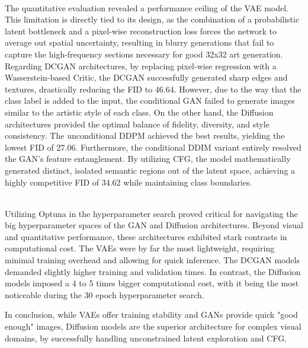 \documentclass[runningheads]{llncs}
\begin{document}
\noindent
\\
The quantitative evaluation revealed a performance ceiling of the VAE model. This limitation is directly tied to its design, as the combination of a probabilistic latent bottleneck and a pixel-wise reconstruction loss forces the network to average out spatial uncertainty, resulting in blurry generations that fail to capture the high-frequency sections necessary for good 32x32 art generation. Regarding DCGAN architectures, by replacing pixel-wise regression with a Wasserstein-based Critic, the DCGAN successfully generated sharp edges and textures, drastically reducing the FID to 46.64. However, due to the way that the class label is added to the input, the conditional GAN failed to generate images similar to the artistic style of each class. On the other hand, the Diffusion architectures provided the optimal balance of fidelity, diversity, and style consistency. The unconditional DDPM achieved the best results, yielding the lowest FID of 27.06. Furthermore, the conditional DDIM variant entirely resolved the GAN's feature entanglement. By utilizing CFG, the model mathematically generated distinct, isolated semantic regions out of the latent space, achieving a highly competitive FID of 34.62 while maintaining class boundaries.

\noindent
\\
Utilizing Optuna in the hyperparameter search proved critical for navigating the big hyperparameter spaces of the GAN and Diffusion architectures. Beyond visual and quantitative performance, these architectures exhibited stark contrasts in computational cost. The VAEs were by far the most lightweight, requiring minimal training overhead and allowing for quick inference. The DCGAN models demanded slightly higher training and validation times. In contrast, the Diffusion models imposed a 4 to 5 times bigger computational cost, with it being the most noticeable during the 30 epoch hyperparameter search.




\noindent
In conclusion, while VAEs offer training stability and GANs provide quick "good enough" images, Diffusion models are the superior architecture for complex visual domains, by successfully handling unconstrained latent exploration and CFG.
\end{document}
